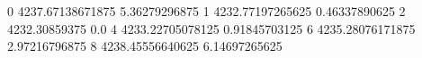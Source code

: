0 4237.67138671875 5.36279296875
1 4232.77197265625 0.46337890625
2 4232.30859375 0.0
4 4233.22705078125 0.91845703125
6 4235.28076171875 2.97216796875
8 4238.45556640625 6.14697265625
